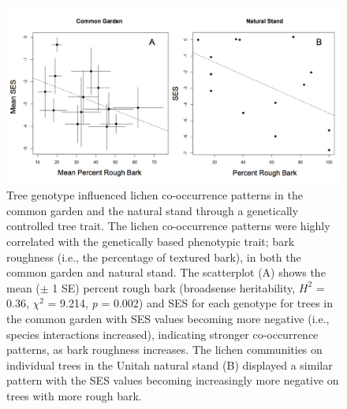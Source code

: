 \documentclass[fleqn,10pt]{wlscirep}
\begin{document}
\begin{figure}[ht]
\centering
\includegraphics[width=\linewidth]{fig2}
\caption{Tree genotype influenced lichen co-occurrence patterns in the
  common garden and the natural stand through a genetically controlled
  tree trait. The lichen co-occurrence patterns were highly correlated
  with the genetically based phenotypic trait; bark roughness (i.e.,
  the percentage of textured bark), in both the common garden and
  natural stand. The scatterplot (A) shows the mean ($\pm$ 1 SE)
  percent rough bark (broadsense heritability, $H^2$ = 0.36, $\chi^2$
  = 9.214, \textit{p} = 0.002) and SES for each genotype for trees in
  the common garden with SES values becoming more negative (i.e.,
  species interactions increased), indicating stronger co-occurrence
  patterns, as bark roughness increases. The lichen communities on
  individual trees in the Unitah natural stand (B) displayed a similar
  pattern with the SES values becoming increasingly more negative on
  trees with more rough bark.}
\label{fig:fig2}
\end{figure}
\end{document}
